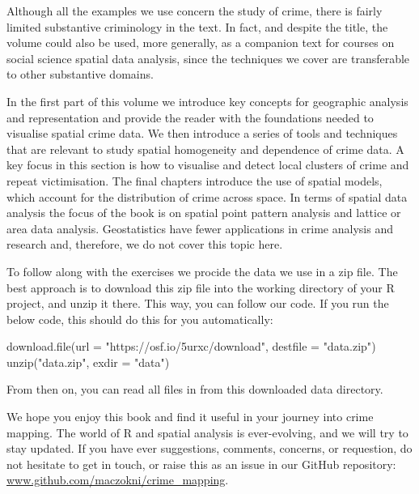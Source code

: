 \documentclass[
]{book}
\newenvironment{Shaded}{\begin{snugshade}}{\end{snugshade}}
\newcommand{\AttributeTok}[1]{\textcolor[rgb]{0.77,0.63,0.00}{#1}}
\newcommand{\FunctionTok}[1]{\textcolor[rgb]{0.00,0.00,0.00}{#1}}
\newcommand{\NormalTok}[1]{#1}
\newcommand{\StringTok}[1]{\textcolor[rgb]{0.31,0.60,0.02}{#1}}
\begin{document}
Although all the examples we use concern the study of crime, there is fairly limited substantive criminology in the text. In fact, and despite the title, the volume could also be used, more generally, as a companion text for courses on social science spatial data analysis, since the techniques we cover are transferable to other substantive domains.

In the first part of this volume we introduce key concepts for geographic analysis and representation and provide the reader with the foundations needed to visualise spatial crime data. We then introduce a series of tools and techniques that are relevant to study spatial homogeneity and dependence of crime data. A key focus in this section is how to visualise and detect local clusters of crime and repeat victimisation. The final chapters introduce the use of spatial models, which account for the distribution of crime across space. In terms of spatial data analysis the focus of the book is on spatial point pattern analysis and lattice or area data analysis. Geostatistics have fewer applications in crime analysis and research and, therefore, we do not cover this topic here.

To follow along with the exercises we procide the data we use in a zip file. The best approach is to download this zip file into the working directory of your R project, and unzip it there. This way, you can follow our code. If you run the below code, this should do this for you automatically:

\begin{Shaded}
\begin{Highlighting}[]
\FunctionTok{download.file}\NormalTok{(}\AttributeTok{url =} \StringTok{"https://osf.io/5urxc/download"}\NormalTok{, }\AttributeTok{destfile =} \StringTok{"data.zip"}\NormalTok{)}
\FunctionTok{unzip}\NormalTok{(}\StringTok{"data.zip"}\NormalTok{, }\AttributeTok{exdir =} \StringTok{"data"}\NormalTok{)}
\end{Highlighting}
\end{Shaded}

From then on, you can read all files in from this downloaded data directory.

We hope you enjoy this book and find it useful in your journey into crime mapping. The world of R and spatial analysis is ever-evolving, and we will try to stay updated. If you have ever suggestions, comments, concerns, or requestion, do not hesitate to get in touch, or raise this as an issue in our GitHub repository: \href{https://github.com/maczokni/crime_mapping}{www.github.com/maczokni/crime\_mapping}.
\end{document}
